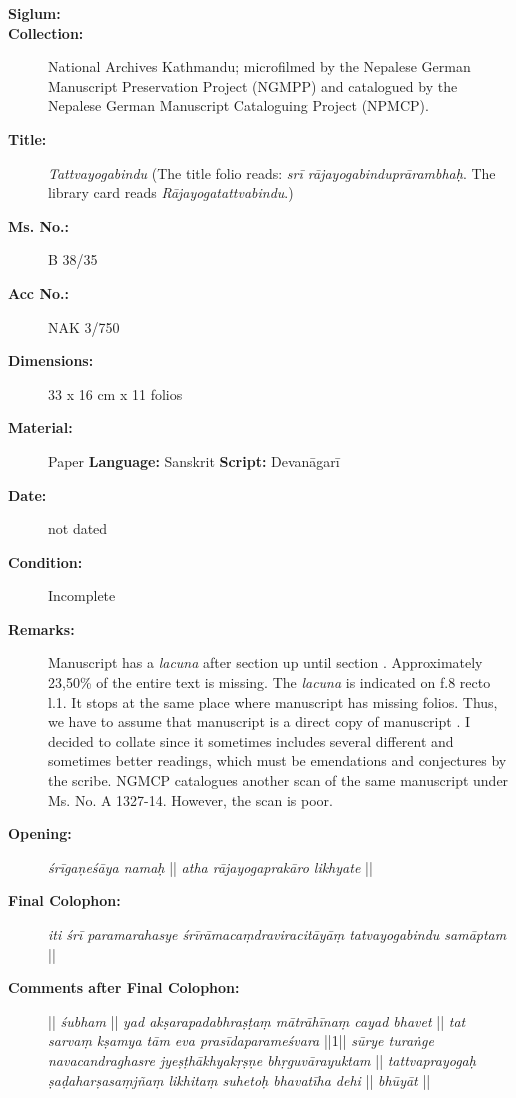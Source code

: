 \begin{description}
\item[\textbf{Siglum:}] \Huge{} \nocite{ytbn2}
\item[\textbf{Collection:}] National Archives Kathmandu; microfilmed by the Nepalese German Manuscript Preservation Project (NGMPP) and catalogued by the Nepalese German Manuscript Cataloguing Project (NPMCP).
\item[\textbf{Title:}] \emph{Tattvayogabindu} (The title folio reads: \textit{srī rājayogabinduprārambhaḥ}. The library card reads \textit{Rājayogatattvabindu}.)
\item[\textbf{Ms. No.:}] B 38/35
\item[\textbf{Acc No.:}] NAK 3/750
\item[\textbf{Dimensions:}] 33 x 16 cm x 11 folios   
\item[\textbf{Material:}] Paper \hspace{0.5cm} \textbf{Language:} Sanskrit \hspace{0.5cm} \textbf{Script:} Devanāgarī 
\item[\textbf{Date:}] not dated
\item[\textbf{Condition:}] Incomplete
\item[\textbf{Remarks:}] Manuscript  has a \textit{lacuna} after section  up until section . Approximately 23,50\% of the entire text is missing. The \textit{lacuna} is indicated on f.8 recto l.1. It stops at the same place where manuscript  has missing folios. Thus, we have to assume that manuscript  is a direct copy of manuscript . I decided to collate  since it sometimes includes several different and sometimes better readings, which must be emendations and conjectures by the scribe. NGMCP catalogues another scan of the same manuscript under Ms. No. A 1327-14. However, the scan is poor.    
\item[\textbf{Opening:}] \textit{śrīgaṇeśāya namaḥ} || \textit{atha rājayogaprakāro  likhyate} ||
\item[\textbf{Final Colophon:}] \textit{iti śrī paramarahasye śrīrāmacaṃdraviracitāyāṃ tatvayogabindu samāptam} || 
\item[\textbf{Comments after Final Colophon:}] || \textit{śubham} || \textit{yad akṣarapadabhraṣṭaṃ mātrāhīnaṃ cayad bhavet} || \textit{tat sarvaṃ kṣamya tām eva prasīdaparameśvara} ||1|| \textit{sūrye turaṅge navacandraghasre jyeṣṭhākhyakṛṣṇe bhṛguvārayuktam} || \textit{tattvaprayogaḥ ṣaḍaharṣasaṃjñaṃ likhitaṃ suhetoḥ bhavatīha dehi} || \textit{bhūyāt} ||
\end{description}

